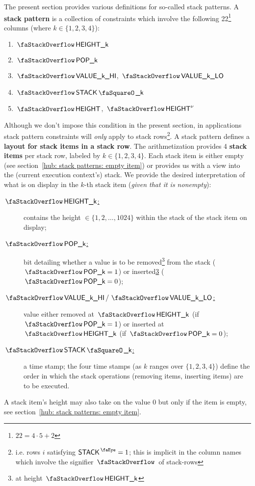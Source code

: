 The present section provides various definitions for so-called stack patterns. A \textbf{stack pattern}\label{def: stack pattern} is a collection of constraints which involve the following 22\footnote{$22 = 4 \cdot 5 + 2$} columns (where $k \in \{1, 2, 3, 4 \}$):
\begin{multicols}{3}
\begin{enumerate}
	\item $\stackItemHeight{k}$
	\item $\stackItemPop{k}$
	\item $\stackItemValHi{k}$, $\stackItemValLo{k}$
	\item $\stackItemStamp{k}$
	\item $\stackHeight$, $\stackHeight\new$
\end{enumerate}
\end{multicols}
\noindent Although we don't impose this condition in the present section, in applications stack pattern constraints will \emph{only} apply to stack rows\footnote{i.e. rows $i$ satisfying $\peekStack = 1$; this is implicit in the column names which involve the signifier $\stackSignifier$ of stack-rows}. A stack pattern defines a \textbf{layout for stack items in a stack row}. The \zkEvm{} arithmetization provides 4 \textbf{stack items}\label{def: stack item} per stack row, labeled by $k \in \{1, 2, 3, 4 \}$. Each stack item is either empty (see section~\ref{hub: stack patterns: empty item}) or provides us with a view into the (current execution context's) stack. We provide the desired interpretation of what is on display in the $k$-th stack item (\emph{given that it is nonempty}):
\begin{description}
	\item[\underline{$\stackItemHeight{k}$:}] contains the height $\in \{1, 2, \dots, 1024 \}$ within the stack of the stack item on display;
	\item[\underline{$\stackItemPop{k}$:}] bit detailing whether a value is to be removed\footnote{\label{footnote: pop at height bla}at height $\stackItemHeight{k}$} from the stack ($\stackItemPop{k} = 1$) or inserted\cref{footnote: pop at height bla} ($\stackItemPop{k} = 0$);
	\item[\underline{$\stackItemValHi{k} \, / \, \stackItemValLo{k}$:}] value either removed at $\stackItemHeight{k}$ (if $\stackItemPop{k} = 1$) or inserted at $\stackItemHeight{k}$ (if $\stackItemPop{k} = 0$);
	\item[\underline{$\stackItemStamp{k}$:}] a time stamp; the four time stamps (as $k$ ranges over $\{1, 2, 3, 4 \}$) define the order in which the stack operations (removing items, inserting items) are to be executed.
\end{description}
\saNote{} A stack item's height may also take on the value $0$ but only if the item is empty, see section~\ref{hub: stack patterns: empty item}.

